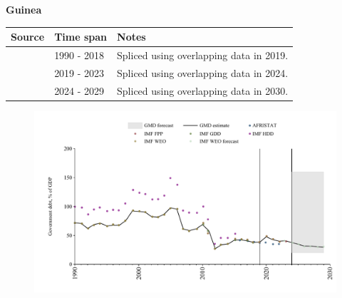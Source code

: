 \documentclass[12pt,a4paper,landscape]{article}
\begin{document}
\begin{adjustbox}{max totalsize={\paperwidth}{\paperheight},center}
\begin{minipage}[t][\textheight][t]{\textwidth}
\vspace*{0.5cm}
{}
\begin{center}
{\Large\bfseries Guinea}
\end{center}
\vspace{0.5cm}
\begin{table}[H]
\centering
\small
\begin{tabular}{|l|l|l|}
\hline
\textbf{Source} & \textbf{Time span} & \textbf{Notes} \\
\hline
\rowcolor{white}\cite{IMF_GDD}& 1990 - 2018 &Spliced using overlapping data in 2019.\\
\rowcolor{lightgray}\cite{IMF_FPP}& 2019 - 2023 &Spliced using overlapping data in 2024.\\
\rowcolor{white}\cite{IMF_WEO_forecast}& 2024 - 2029 &Spliced using overlapping data in 2030.\\
\hline
\end{tabular}
\end{table}
\begin{figure}[H]
\centering
\includegraphics[width=\textwidth,height=0.6\textheight,keepaspectratio]{graphs/GIN_govdebt_GDP.pdf}
\end{figure}
\end{minipage}
\end{adjustbox}
\end{document}
